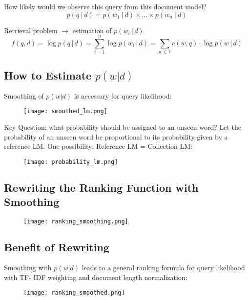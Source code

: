 How likely would we observe this query from this document model?
\begin{equation*}
p(q \:\big|\: d) = p(w_1 \:\big|\: d) \times \dots \times p(w_n \:\big|\: d)
\end{equation*}

Retrieval problem $\to$ estimation of $p(w_i \,\big|\, d)$
\begin{equation*}
f(q, d) = \log p(q \,\big|\, d) = \sum_{i=1}^{n} \log p(w_i \,\big|\, d) = \sum_{w \in V} c(w, q) \cdot \log p(w \,\big|\, d)
\end{equation*}

\subsection{How to Estimate $p(w \big| d)$}
Smoothing of $p(w \big| d)$ is necessary for query likelihood:
\begin{figure}[H]
    \centering
    \texttt{[image: smoothed\_lm.png]}
\end{figure}

Key Question: what probability should be assigned to an unseen word? Let the probability of an unseen word be proportional to its probability given by a reference LM. One possibility: Reference LM = Collection LM:
\begin{figure}[H]
    \centering
    \texttt{[image: probability\_lm.png]}
\end{figure}

\subsection{Rewriting the Ranking Function with Smoothing}
\begin{figure}[H]
    \centering
    \texttt{[image: ranking\_smoothing.png]}
\end{figure}

\subsection{Benefit of Rewriting}

Smoothing with $p(w \big| d)$ leads to a general ranking formula for query likelihood with TF- IDF weighting and document length normalization:
\begin{figure}[H]
    \centering
    \texttt{[image: ranking\_smoothed.png]}
\end{figure}

